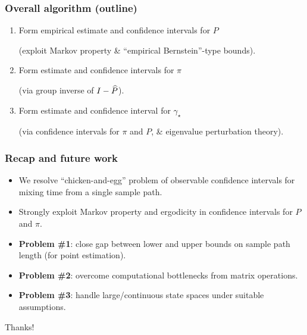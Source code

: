 \documentclass[11pt,compress,blue4]{beamer}
\newcommand\fns\footnotesize
\newcommand\gap{\ensuremath{\gamma_{\star}}}
\begin{document}
\begin{frame}
  \frametitle{Overall algorithm (outline)}

  \begin{enumerate}
    \item
      Form empirical estimate and confidence intervals for $P$

      {\fns(exploit Markov property \& ``empirical Bernstein''-type bounds)}.

      \medskip

    \item
      Form estimate and confidence intervals for $\pi$

      {\fns(via group inverse of $I - \widehat P$)}.

      \medskip

    \item
      Form estimate and confidence interval for $\gap$

      {\fns(via confidence intervals for $\pi$ and $P$, \& eigenvalue perturbation theory)}.

  \end{enumerate}
\end{frame}


\begin{frame}
  \frametitle{Recap and future work}

  \begin{itemize}
    \item
      We resolve ``chicken-and-egg'' problem of observable
      confidence intervals for mixing time from a single sample path.

    \item<2->
      Strongly exploit Markov property and ergodicity in confidence
      intervals for $P$ and $\pi$.

    \item<3->
      \textbf{Problem \#1}:
      close gap between lower and upper bounds on sample path length
      (for point estimation).

    \item<4->
      \textbf{Problem \#2}:
      overcome computational bottlenecks from matrix operations.

    \item<5->
      \textbf{Problem \#3}:
      handle large/continuous state spaces under suitable assumptions.

  \end{itemize}

\end{frame}


\begin{frame}
  \begin{center}
    \Huge
    Thanks!
  \end{center}
\end{frame}

\end{document}
